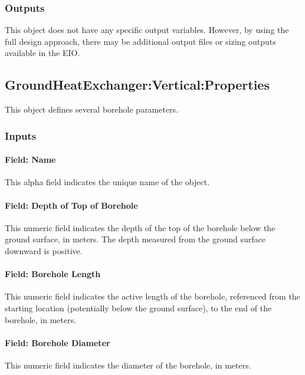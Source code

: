 \subsubsection{Outputs}

This object does not have any specific output variables.
However, by using the full design approach, there may be additional output files or sizing outputs available in the EIO.

\subsection{GroundHeatExchanger:Vertical:Properties}\label{groundheatexchangerverticalproperties}

This object defines several borehole parameters.

\subsubsection{Inputs}

\paragraph{Field: Name}

This alpha field indicates the unique name of the object.

\paragraph{Field: Depth of Top of Borehole}

This numeric field indicates the depth of the top of the borehole below the ground surface, in meters. The depth measured from the ground surface downward is positive.

\paragraph{Field: Borehole Length}

This numeric field indicates the active length of the borehole, referenced from the starting location (potentially below the ground surface), to the end of the borehole, in meters.

\paragraph{Field: Borehole Diameter}

This numeric field indicates the diameter of the borehole, in meters.

